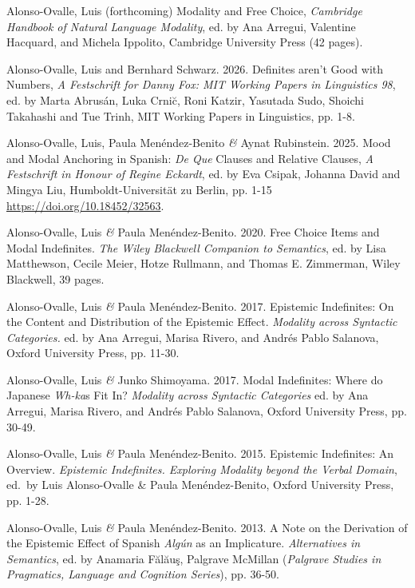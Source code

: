 \documentclass[11pt]{article}
\begin{document}
Alonso-Ovalle, Luis (forthcoming) Modality and Free Choice, \textit{Cambridge Handbook of Natural Language Modality}, ed. by Ana Arregui, Valentine Hacquard, and Michela Ippolito, Cambridge University Press (42 pages).

Alonso-Ovalle, Luis and Bernhard Schwarz. 2026. Definites aren't Good with Numbers, \textit{A Festschrift for Danny Fox: MIT Working Papers in Linguistics 98}, ed. by Marta Abrus\'an, Luka Crni\u{c}, Roni Katzir, Yasutada Sudo, Shoichi Takahashi and Tue Trinh, MIT Working Papers in Linguistics, pp. 1-8.

Alonso-Ovalle, Luis, Paula Men\'endez-Benito \textit{\&} Aynat Rubinstein. 2025. Mood and Modal Anchoring in Spanish: \textit{De Que} Clauses and Relative Clauses, \textit{A Festschrift
in Honour of Regine Eckardt}, ed. by Eva Csipak, Johanna David and Mingya Liu, Humboldt-Universit\"{a}t zu Berlin, pp. 1-15 \href{https://doi.org/10.18452/32563}{https://doi.org/10.18452/32563}.

Alonso-Ovalle, Luis \textit{\&} Paula Men\'endez-Benito. 2020. Free Choice Items and Modal Indefinites. \textit{The Wiley Blackwell Companion to Semantics}, ed. by Lisa Matthewson, Cecile Meier, Hotze Rullmann, and Thomas E. Zimmerman, Wiley Blackwell, 39 pages. %

Alonso-Ovalle, Luis \textit{\&} Paula Men\'endez-Benito. 2017. Epistemic Indefinites: On the Content and Distribution of the Epistemic Effect. \textit{Modality across Syntactic Categories.} ed. by Ana Arregui, Marisa Rivero, and Andr\'es Pablo Salanova, Oxford University Press, pp. 11-30.

Alonso-Ovalle, Luis \textit{\&} Junko Shimoyama. 2017. Modal Indefinites: Where do Japanese \textit{Wh-ka}s Fit In? \textit{Modality across Syntactic Categories} ed. by Ana Arregui, Marisa Rivero, and Andr\'es Pablo Salanova, Oxford University Press,  pp. 30-49.

Alonso-Ovalle, Luis \textit{\&} Paula Men\'endez-Benito. 2015. Epistemic Indefinites: An Overview. \textit{Epistemic Indefinites. Exploring Modality beyond the Verbal Domain}, ed.\ by Luis Alonso-Ovalle \& Paula Men\'endez-Benito, Oxford University Press, pp. 1-28.

Alonso-Ovalle, Luis \textit{\&} Paula Men\'endez-Benito. 2013. A Note on the Derivation of the Epistemic Effect of Spanish
\textit{Alg\'un} as an Implicature. \textit{Alternatives in Semantics}, ed. by
Anamaria F\u{a}l\u{a}u\c{s}, Palgrave McMillan (\textit{Palgrave
  Studies in Pragmatics, Language and Cognition Series}), pp. 36-50.
\end{document}
